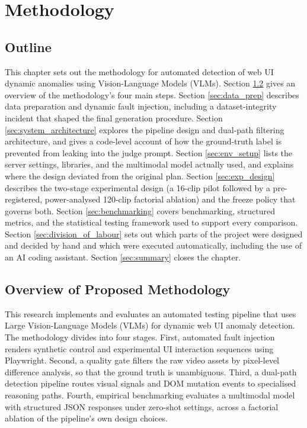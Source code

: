 \chapter{Methodology}
\label{chap:methodology}

\section{Outline}
This chapter sets out the methodology for automated detection of web UI dynamic anomalies using Vision-Language Models (VLMs). Section \ref{sec:overview} gives an overview of the methodology's four main steps. Section \ref{sec:data_prep} describes data preparation and dynamic fault injection, including a dataset-integrity incident that shaped the final generation procedure. Section \ref{sec:system_architecture} explores the pipeline design and dual-path filtering architecture, and gives a code-level account of how the ground-truth label is prevented from leaking into the judge prompt. Section \ref{sec:env_setup} lists the server settings, libraries, and the multimodal model actually used, and explains where the design deviated from the original plan. Section \ref{sec:exp_design} describes the two-stage experimental design (a 16-clip pilot followed by a pre-registered, power-analysed 120-clip factorial ablation) and the freeze policy that governs both. Section \ref{sec:benchmarking} covers benchmarking, structured metrics, and the statistical testing framework used to support every comparison. Section \ref{sec:division_of_labour} sets out which parts of the project were designed and decided by hand and which were executed automatically, including the use of an AI coding assistant. Section \ref{sec:summary} closes the chapter.

\section{Overview of Proposed Methodology}
\label{sec:overview}
This research implements and evaluates an automated testing pipeline that uses Large Vision-Language Models (VLMs) for dynamic web UI anomaly detection. The methodology divides into four stages. First, automated fault injection renders synthetic control and experimental UI interaction sequences using Playwright. Second, a quality gate filters the raw video assets by pixel-level difference analysis, so that the ground truth is unambiguous. Third, a dual-path detection pipeline routes visual signals and DOM mutation events to specialised reasoning paths. Fourth, empirical benchmarking evaluates a multimodal model with structured JSON responses under zero-shot settings, across a factorial ablation of the pipeline's own design choices.

